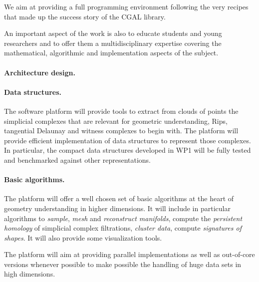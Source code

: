We aim at providing  a full programming environment
%
following the very recipes that made up the success story of the CGAL
library.  

An important aspect of the work is also to educate students and young
researchers and to offer them a multidisciplinary expertise covering
the mathematical, algorithmic and implementation aspects of the subject.

\paragraph{Architecture design.}

\paragraph{Data structures.}
The software platform will provide tools to extract from clouds of
points the simplicial complexes that are relevant for geometric
understanding, Rips, tangential Delaunay and witness complexes to
begin with.  The platform will provide efficient implementation of
data structures to represent those complexes. In
particular, the compact data structures developed in WP1 will be fully
tested and benchmarked against other representations.

\paragraph{Basic algorithms.}
The platform will offer a well chosen set of basic algorithms at the
heart of geometry understanding in higher dimensions. It will 
include in particular algorithms to
{\em sample},  {\em mesh} and {\em  reconstruct manifolds}, 
 compute the {\em persistent homology} of simplicial complex filtrations,
{\em cluster data}, compute {\em signatures of shapes}. It will also
provide some visualization tools.


The platform will aim at providing parallel implementations as well
as out-of-core versions whenever possible to make possible the
handling of huge data sets in high dimensions.

